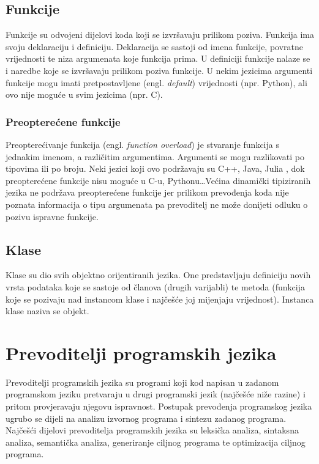 \documentclass[times, utf8, zavrsni]{fer}
\begin{document}
\section{Funkcije}
Funkcije su odvojeni dijelovi koda koji se izvršavaju prilikom poziva. Funkcija ima svoju deklaraciju i definiciju. Deklaracija se sastoji od imena funkcije, povratne vrijednosti 
te niza argumenata koje funkcija prima. U definiciji funkcije nalaze se i naredbe koje se izvršavaju prilikom poziva funkcije. U nekim jezicima argumenti funkcije mogu imati 
pretpostavljene (engl. \textit{default}) vrijednosti (npr. Python), ali ovo nije moguće u svim jezicima (npr. C).

\subsection{Preopterećene funkcije}
Preopterećivanje funkcija (engl. \textit{function overload}) je stvaranje funkcija s jednakim imenom, a različitim argumentima. Argumenti se mogu razlikovati po tipovima
ili po broju. Neki jezici koji ovo podržavaju su C++, Java, Julia \citep{Kahanwal2014ComparativeSO}, dok preopterećene funkcije nisu moguće u C-u, Pythonu\dots Većina dinamički tipiziranih jezika ne podržava
preopterećene funkcije jer prilikom prevođenja koda nije poznata informacija o tipu argumenata pa prevoditelj ne može donijeti odluku o pozivu ispravne funkcije.

\section{Klase}
Klase su dio svih objektno orijentiranih jezika. One predstavljaju definiciju novih vrsta podataka koje se sastoje od članova (drugih varijabli) te metoda (funkcija koje se pozivaju
nad instancom klase i najčešće joj mijenjaju vrijednost). Instanca klase naziva se objekt.

\chapter{Prevoditelji programskih jezika}
Prevoditelji programskih jezika su programi koji kod napisan u zadanom programskom jeziku pretvaraju u drugi programski jezik (najčešće niže razine) i pritom provjeravaju njegovu ispravnost.
Postupak prevođenja programskog jezika ugrubo se dijeli na analizu izvornog programa i sintezu zadanog programa. Najčešći dijelovi prevoditelja programskih jezika su leksička analiza,
sintaksna analiza, semantička analiza, generiranje ciljnog programa te optimizacija ciljnog programa.
\end{document}
